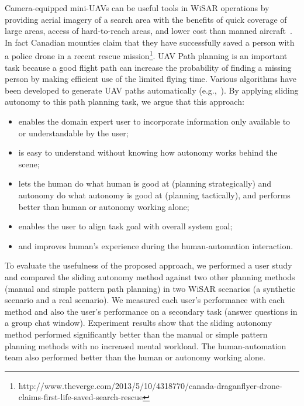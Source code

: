 \documentclass[journal]{IEEEtran}
\begin{document}
Camera-equipped mini-UAVs can be useful tools in WiSAR operations by providing aerial imagery of a search area with the benefits of quick coverage of large areas, access of hard-to-reach areas, and lower cost than manned aircraft~\cite{Murphy2008Cooperative, Goodrich2008Supporting}. In fact Canadian mounties claim that they have successfully saved a person with a police drone in a recent rescue mission\footnote{http://www.theverge.com/2013/5/10/4318770/canada-draganflyer-drone-claims-first-life-saved-search-rescue}. UAV Path planning is an important task because a good flight path can increase the probability of finding a missing person by making efficient use of the limited flying time. Various algorithms have been developed to generate UAV paths automatically (e.g.,~\cite{Bourgault2003Coordinated, Lin2009UAV, Lin2014Hierarchical}). By applying sliding autonomy to this path planning task, we argue that this approach:
\begin{itemize}
\item enables the domain expert user to incorporate information only available to or understandable by the user;
\item is easy to understand without knowing how autonomy works behind the scene;
\item lets the human do what human is good at (planning strategically) and autonomy do what autonomy is good at (planning tactically), and performs better than human or autonomy working alone;
\item enables the user to align task goal with overall system goal;
\item and improves human's experience during the human-automation interaction.
\end{itemize}

To evaluate the usefulness of the proposed approach, we performed a user study and compared the sliding autonomy method against two other planning methods (manual and simple pattern path planning) in two WiSAR scenarios (a synthetic scenario and a real scenario). We measured each user's performance with each method and also the user's performance on a secondary task (answer questions in a group chat window). Experiment results show that the sliding autonomy method performed significantly better than the manual or simple pattern planning methods with no increased mental workload. The human-automation team also performed better than the human or autonomy working alone.
\end{document}
